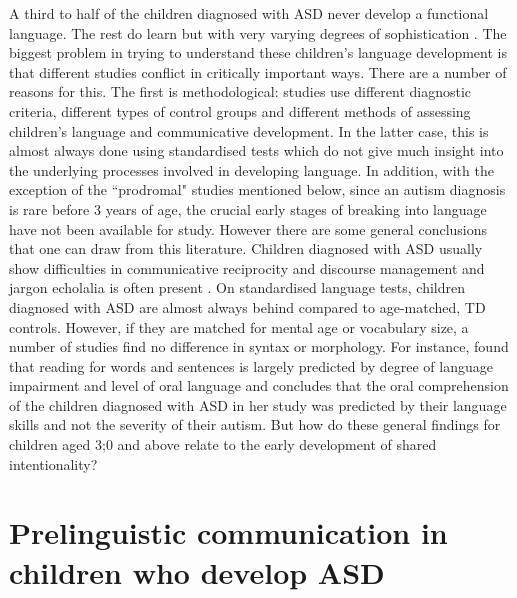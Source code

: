 \documentclass[output=paper]{langsci/langscibook}
\begin{document}
 A third to half of the children diagnosed with ASD never develop a functional language.  The rest do learn but with very varying degrees of sophistication \citep{Wetherby1992,Noens2006}.  The biggest problem in trying to understand these children’s language development is that different studies conflict in critically important ways.  There are a number of reasons for this.  The first is methodological: studies use different diagnostic criteria, different types of control groups and different methods of assessing children’s language and communicative development.  In the latter case, this is almost always done using standardised tests which do not give much insight into the underlying processes involved in developing language.  In addition, with the exception of the ``prodromal" studies mentioned below, since an autism diagnosis is rare before 3 years of age, the crucial early stages of breaking into language have not been available for study.  However there are some general conclusions that one can draw from this literature.  Children diagnosed with ASD   usually show difficulties in communicative reciprocity and discourse management \citep{Anderson2009} and jargon echolalia is often present \citep{Roberts2014}. On standardised language tests,  children diagnosed with ASD are almost always behind compared to age-matched, TD controls.  However, if they are matched for mental age or vocabulary size, a number of studies find no difference in syntax or morphology. For instance, \citet{Brock2014} found that reading for words and sentences is largely predicted by degree of language impairment and level of oral language and \citet{Norbury2005} concludes that the oral comprehension of the children diagnosed with ASD in her study was predicted by their language skills and not the severity of their autism.  But how do these general findings for children aged 3;0 and above relate to the early development of shared intentionality? 

\section{Prelinguistic communication in children who develop ASD}
\end{document}
